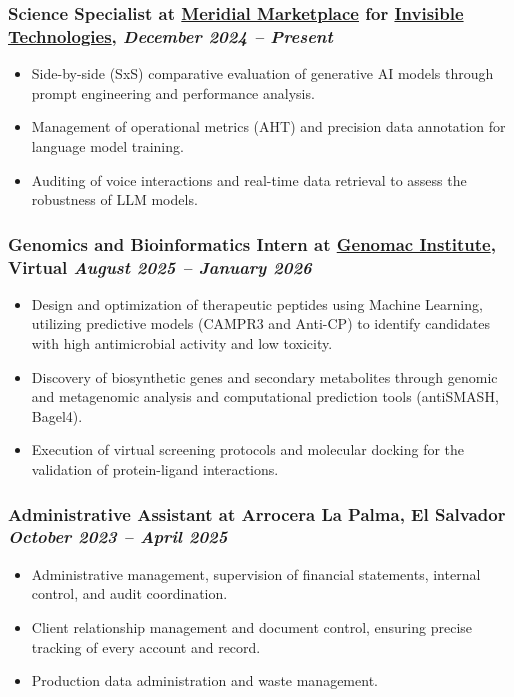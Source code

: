 \documentclass[a4paper,10pt]{article}
\begin{document}
\subsubsection*{%
  \textbf{Science Specialist} at \href{https://www.linkedin.com/company/meridial-marketplace}{Meridial Marketplace} for \href{https://www.linkedin.com/company/invisible-technologies-inc-/}{Invisible Technologies},
  \hfill
  \textit{December 2024 -- Present}
}
\begin{itemize}
  \item Side-by-side (SxS) comparative evaluation of generative AI models through prompt engineering and performance analysis.
  \item Management of operational metrics (AHT) and precision data annotation for language model training.
  \item Auditing of voice interactions and real-time data retrieval to assess the robustness of LLM models.
\end{itemize}

\subsubsection*{%
  \textbf{Genomics and Bioinformatics Intern} at \href{https://www.linkedin.com/company/genomics-research-center-genomac-hub/posts/?feedView=all}{Genomac Institute}, Virtual
  \hfill
  \textit{August 2025 -- January 2026}
}
\begin{itemize}
  \item Design and optimization of therapeutic peptides using Machine Learning, utilizing predictive models (CAMPR3 and Anti-CP) to identify candidates with high antimicrobial activity and low toxicity.
  \item Discovery of biosynthetic genes and secondary metabolites through genomic and metagenomic analysis and computational prediction tools (antiSMASH, Bagel4).
  \item Execution of virtual screening protocols and molecular docking for the validation of protein-ligand interactions.
\end{itemize}

\subsubsection*{%
  \textbf{Administrative Assistant} at Arrocera La Palma, El Salvador
  \hfill
  \textit{October 2023 -- April 2025}
}
\begin{itemize}
  \item Administrative management, supervision of financial statements, internal control, and audit coordination.
  \item Client relationship management and document control, ensuring precise tracking of every account and record.
  \item Production data administration and waste management. 
\end{itemize}
\end{document}
